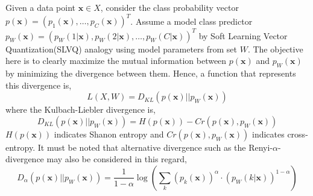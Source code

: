 \documentclass[english]{HSMW-Thesis}
\begin{document}
Given a data point \hspace{2pt}$\mathbf{x}\in X$,\hspace{2pt} consider the class probability vector\hspace{2pt} 
$p\left( \mathbf{x}\right) =\left( p_{1}\left( \mathbf{x}\right)  ,\ldots,p_{C}\left( \mathbf{x}\right)\right)^{T}  $.\hspace{2pt} Assume a model class predictor\hspace{2pt} $p_{W}\left( \mathbf{x}\right) = \left( p_{W}\left( 1|\mathbf{x}\right) ,p_{W}\left( 2|\mathbf{x}\right) ,\ldots,p_{W}\left( C|\mathbf{x}\right)\right) ^{T} $\hspace{2pt} by Soft Learning Vector Quantization(SLVQ) analogy using model parameters from set\hspace{2pt} $W$.\hspace{2pt} The objective here is to clearly maximize the mutual information between \hspace{2pt}$p\left( \mathbf{x}\right) $\hspace{2pt} and \hspace{2pt}$p_{W}\left( \mathbf{x}\right) $\hspace{2pt}by minimizing the divergence between them\cite{villmann2018probabilistic}. Hence, a function that represents this divergence is,
\begin{equation}\label{local errors}
	L\left( X,W\right) = D_{KL}\left( p\left( \mathbf{x}\right) ||p_{W}\left( \mathbf{x}\right) \right) 
\end{equation}
where the Kulbach-Liebler divergence is,
\begin{equation*}%
	D_{KL}\left( p\left( \mathbf{x}\right) ||p_{W}\left( \mathbf{x}\right) \right)= H\left( p\left( \mathbf{x}\right)\right)  - Cr\left( p\left( \mathbf{x}\right) ,p_{W}\left( \mathbf{x}\right) \right) 
\end{equation*}
$H\left( p\left( \mathbf{x}\right)\right) $ \hspace{2pt}indicates Shanon entropy and\hspace{2pt} $Cr\left( p\left( \mathbf{x}\right) ,p_{W}\left( \mathbf{x}\right) \right)$\hspace{2pt} indicates cross-entropy.
It must be noted that alternative divergence such as the Renyi-$\alpha$-divergence may also be considered in this regard,
\begin{equation}\label{Renyi-divergence}
	D_{\alpha}\left( p\left( \mathbf{x}\right) ||p_{W}\left( \mathbf{x}\right) \right) =\frac{1}{1-\alpha}\log\left( \sum_{k}\left( p_{k}\left( \mathbf{x}\right) \right) ^{\alpha}\cdot\left( p_{W}\left( k|\mathbf{x}\right) \right) ^{1-\alpha}\right) 	
\end{equation}
\end{document}
